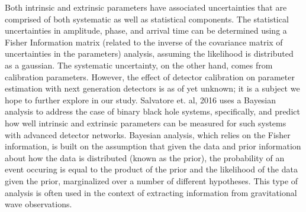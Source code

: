 \documentclass{article}
\begin{document}
Both intrinsic and extrinsic parameters have associated uncertainties that are comprised of both systematic as well as statistical components.  The statistical uncertainties in amplitude, phase, and arrival time can be determined using a Fisher Information matrix (related to the inverse of the covariance matrix of uncertainties in the parameters) analysis, assuming the likelihood is distributed as a gaussian.  The systematic uncertainty, on the other hand, comes from calibration parameters.  However, the effect of detector calibration on parameter estimation with next generation detectors is as of yet unknown; it is a subject we hope to further explore in our study. Salvatore et. al, 2016 uses a Bayesian analysis to address the case of binary black hole systems, specifically, and predict how well intrinsic and extrinsic parameters can be measured for such systems with advanced detector networks.  Bayesian analysis, which relies on the Fisher information, is built on the assumption that given the data and prior information about how the data is distributed (known as the prior), the probability of an event occuring is equal to the product of the prior and the likelihood of the data given the prior, marginalized over a number of different hypotheses.  This type of analysis is often used in the context of extracting information from gravitational wave observations. 
\end{document}
